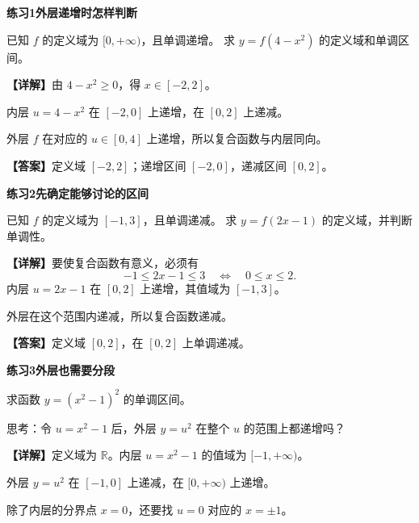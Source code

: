 \documentclass[UTF8,10pt,aspectratio=169]{ctexbeamer}
\newcommand{\PageHeading}[1]{\begin{center}{\Large\bfseries #1}\end{center}\vspace{0.2cm}}
\newcommand{\Answer}[1]{\par\vspace{0.2cm}\textbf{【答案】}#1}
\newcommand{\Analysis}[1]{\par\vspace{0.2cm}\textbf{【详解】}#1}
\begin{document}
\begin{frame}[t,label=F12]
  \PageHeading{练习1\quad 外层递增时怎样判断}
  已知 $f$ 的定义域为 $[0,+\infty)$，且单调递增。
  求 $y=f(4-x^2)$ 的定义域和单调区间。
  \pause
  \Analysis{由 $4-x^2\ge0$，得 $x\in[-2,2]$。
  \par 内层 $u=4-x^2$ 在 $[-2,0]$ 上递增，在 $[0,2]$ 上递减。
  \par 外层 $f$ 在对应的 $u\in[0,4]$ 上递增，所以复合函数与内层同向。}
  \Answer{定义域 $[-2,2]$；递增区间 $[-2,0]$，递减区间 $[0,2]$。}
\end{frame}

\begin{frame}[t,label=F13]
  \PageHeading{练习2\quad 先确定能够讨论的区间}
  已知 $f$ 的定义域为 $[-1,3]$，且单调递减。
  求 $y=f(2x-1)$ 的定义域，并判断单调性。
  \pause
  \Analysis{要使复合函数有意义，必须有
  \[
     -1\le2x-1\le3\quad\Longleftrightarrow\quad0\le x\le2.
  \]
  内层 $u=2x-1$ 在 $[0,2]$ 上递增，其值域为 $[-1,3]$。
  \par 外层在这个范围内递减，所以复合函数递减。}
  \Answer{定义域 $[0,2]$，在 $[0,2]$ 上单调递减。}
\end{frame}

\begin{frame}[t,label=F14]
  \PageHeading{练习3\quad 外层也需要分段}
  求函数 $y=(x^2-1)^2$ 的单调区间。
  \par\vspace{0.3cm}
  思考：令 $u=x^2-1$ 后，外层 $y=u^2$ 在整个 $u$ 的范围上都递增吗？
  \pause
  \Analysis{定义域为 $\mathbb R$。内层 $u=x^2-1$ 的值域为 $[-1,+\infty)$。
  \par 外层 $y=u^2$ 在 $[-1,0]$ 上递减，在 $[0,+\infty)$ 上递增。
  \par 除了内层的分界点 $x=0$，还要找 $u=0$ 对应的 $x=\pm1$。}
\end{frame}
\end{document}
